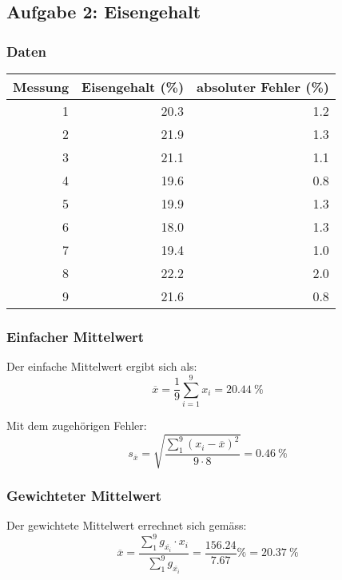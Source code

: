 \subsection{Aufgabe 2: Eisengehalt}

\subsubsection{Daten}
\begin{center}
\begin{tabular}{rrr}
    \toprule
    Messung & Eisengehalt (\%) & absoluter Fehler (\%) \\
    \midrule
    1 & 20.3 & 1.2 \\
    2 & 21.9 & 1.3 \\
    3 & 21.1 & 1.1 \\
    4 & 19.6 & 0.8 \\
    5 & 19.9 & 1.3 \\
    6 & 18.0 & 1.3 \\
    7 & 19.4 & 1.0 \\
    8 & 22.2 & 2.0 \\
    9 & 21.6 & 0.8 \\
    \bottomrule
\end{tabular}
\end{center}

\subsubsection{Einfacher Mittelwert}

Der einfache Mittelwert ergibt sich als:
\begin{equation}
    \overline{x} = \frac{1}{9}\sum_{i=1}^9 x_i = \SI{20.44}{\percent}
\end{equation}

Mit dem zugeh\"origen Fehler:
\begin{equation}
    s_{\overline{x}} = \sqrt{\frac{\sum_1^9(x_i-\overline{x})^2}{9 \cdot 8}} = \SI{0.46}{\percent}
\end{equation}


\subsubsection{Gewichteter Mittelwert}

Der gewichtete Mittelwert errechnet sich gem\"ass:
\begin{equation}
    \overline{x} = \frac{\sum_1^9 g_{\overline{x_i}} \cdot x_i}{\sum_1^9 g_{\overline{x_i}}} = \frac{156.24}{7.67} \si{\percent} = \SI{20.37}{\percent}
\end{equation}

